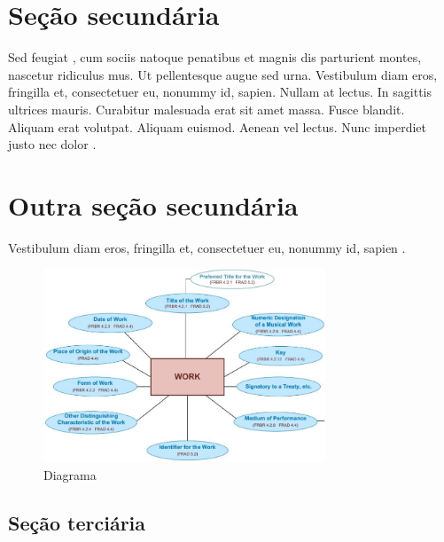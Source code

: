 \lipsum[8-9]



\section{Seção secundária}


\lipsum[10]

Sed feugiat , cum sociis natoque penatibus et magnis dis parturient montes, nascetur ridiculus mus. Ut pellentesque augue sed urna. Vestibulum diam eros, fringilla et, consectetuer eu, nonummy id, sapien. Nullam at lectus. In sagittis ultrices mauris. Curabitur malesuada erat sit amet massa. Fusce blandit. Aliquam erat volutpat. Aliquam euismod. Aenean vel lectus. Nunc imperdiet justo nec dolor \cite{BirdEA2014,Botelho2021,BrandaoEA2012}.


\section{Outra seção secundária}

Vestibulum diam eros, fringilla et, consectetuer eu, nonummy id, sapien \cite{BoyceDiprima2015,CostaAndrade2022}.


\lipsum[12]


\begin{figure}[htb]
\centering
\caption{Diagrama}\label{fig2}
\includegraphics[width=0.75\textwidth]{./dados/figuras/exemplo_fig2.png}
\end{figure}


\lipsum[13-14]



\subsection{Seção terciária}

\lipsum[15-17]
